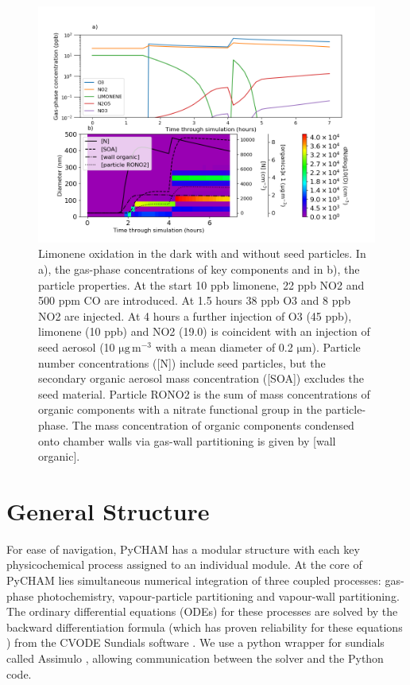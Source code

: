 \documentclass[gmd, manuscript]{copernicus}
\begin{document}
\begin{figure}[t]
\includegraphics[width=12.0cm]{Results/limonene_res_plot.png}
\caption{Limonene oxidation in the dark with and without seed particles.  In a), the gas-phase concentrations of key components and in b), the particle properties.  At the start 10 ppb limonene, 22 ppb NO2 and 500 ppm CO are introduced.  At 1.5 hours 38 ppb O3 and 8 ppb NO2 are injected.  At 4 hours a further injection of O3 (45 ppb), limonene (10 ppb) and NO2 (19.0) is coincident with an injection of seed aerosol (10 $\mathrm{\mu g\, m^{-3}}$ with a mean diameter of 0.2 $\mathrm{\mu m}$).  Particle number concentrations ([N]) include seed particles, but the secondary organic aerosol mass concentration ([SOA]) excludes the seed material.  Particle RONO2 is the sum of mass concentrations of organic components with a nitrate functional group in the particle-phase.  The mass concentration of organic components condensed onto chamber walls via gas-wall partitioning is given by [wall organic].}
\label{fig:limonene_output_plot}
\end{figure}

\section{General Structure}\label{sec:general}

For ease of navigation, PyCHAM has a modular structure with each key physicochemical process assigned to an individual module.  At the core of PyCHAM lies simultaneous numerical integration of three coupled processes: gas-phase photochemistry, vapour-particle partitioning and vapour-wall partitioning.  The ordinary differential equations (ODEs) for these processes are solved by the backward differentiation formula (which has proven reliability for these equations \citep{Jacobson2005}) from the CVODE Sundials software \citep{hindmarsh2005sundials}.  We use a python wrapper for sundials called Assimulo \citep{Andersson2015}, allowing communication between the solver and the Python code.
\end{document}
